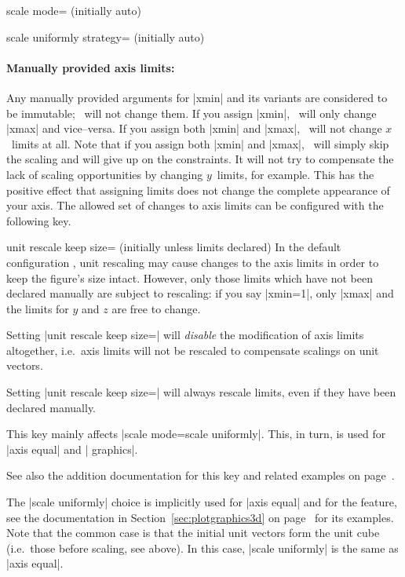 \begin{pgfplotskey}{scale mode= (initially auto)}
\begin{pgfplotskey}{scale uniformly strategy= (initially auto)}
	\end{pgfplotskey}

	\paragraph{Manually provided axis limits:} Any manually provided arguments for |xmin| and its variants are considered to be immutable; \PGFPlots\ will not change them. If you assign |xmin|, \PGFPlots\ will only change |xmax| and vice--versa. If you assign both |xmin| and |xmax|, \PGFPlots\ will not change $x$~limits at all. Note that if you assign both |xmin| and |xmax|, \PGFPlots\ will simply skip the scaling and will give up on the constraints. It will not try to compensate the lack of scaling opportunities by changing $y$~limits, for example. This has the positive effect that assigning limits does not change the complete appearance of your axis.  The allowed set of changes to axis limits can be configured with the following key.

	\begin{pgfplotskey}{
		unit rescale keep size= (initially unless limits declared)}
		In the default configuration , unit rescaling may cause changes to the axis limits in order to keep the figure's size intact. However, only those limits which have not been declared manually are subject to rescaling: if you say |xmin=1|, only |xmax| and the limits for $y$ and $z$ are free to change.

		Setting |unit rescale keep size=| will \emph{disable} the modification of axis limits altogether, i.e.\ axis limits will not be rescaled to compensate scalings on unit vectors.

		Setting |unit rescale keep size=| will always rescale limits, even if they have been declared manually.
		
		This key mainly affects |scale mode=scale uniformly|. This, in turn, is used for |axis equal| and | graphics|.

		See also the addition documentation for this key and related examples on page~\pageref{key:unit:rescale:keep:size}.
	\end{pgfplotskey}

	The |scale uniformly| choice is implicitly used for |axis equal| and for the  feature, see the documentation in Section~\ref{sec:plotgraphics3d} on page~\pageref{sec:plotgraphics3d} for its examples. Note that the common case is that the initial unit vectors form the unit cube (i.e.\ those before scaling, see above). In this case, |scale uniformly| is the same as |axis equal|.
\end{pgfplotskey}

